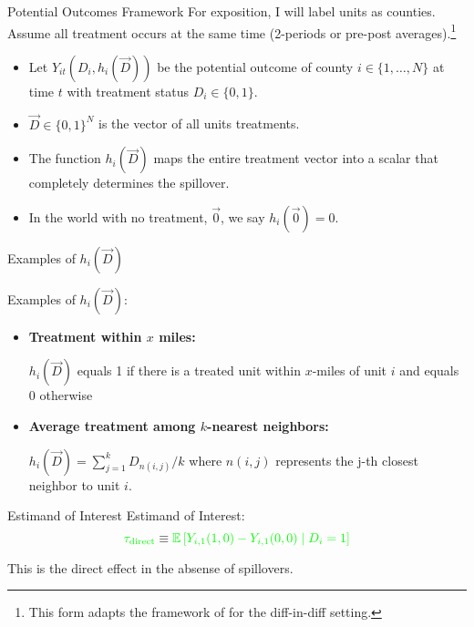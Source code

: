 \documentclass[aspectratio=43]{beamer}
\begin{document}
\begin{frame}{Potential Outcomes Framework}
    For exposition, I will label units as counties. Assume all treatment occurs at the same time (2-periods or pre-post averages).\footnote{This form adapts the framework of \citet{Vazquez-Bare_2019} for the diff-in-diff setting.}
    
    \begin{itemize}
        \item Let $Y_{it}(D_i, h_i(\vec{D}))$ be the potential outcome of county $i \in \{ 1, \dots, N \}$ at time $t$ with treatment status $D_i \in \{0, 1\}$.
        
        \item $\vec{D} \in \{0,1\}^N$ is the vector of all units treatments.
        
        \item The function $h_i(\vec{D})$ maps the entire treatment vector into a scalar that completely determines the spillover. 
        
        \item In the world with no treatment, $\vec{0}$, we say $h_i(\vec{0}) = 0$.
    \end{itemize}
\end{frame}

\begin{frame}{Examples of $h_i(\vec{D})$}
    
    Examples of $h_i(\vec{D})$:
    
    \begin{itemize}
        \item \textbf{Treatment within $x$ miles:}
        
        $h_i(\vec{D})$ equals 1 if there is a treated unit within $x$-miles of unit $i$ and equals 0 otherwise
            
        \vspace{2.5mm}
        \item \textbf{Average treatment among $k$-nearest neighbors:}
        
        $h_i(\vec{D}) = \sum_{j = 1}^k D_{n(i,j)} / k$ where $n(i,j)$ represents the j-th closest neighbor to unit $i$. 


    \end{itemize}
\end{frame}

\begin{frame}{Estimand of Interest}
    Estimand of Interest: \[ 
        \textcolor{green}{\tau_{\text{direct}}} \equiv \textcolor{green}{\mathbb{E}\left[ Y_{i,1}(1, 0) - Y_{i,1}(0, 0) \mid D_i = 1\right]}
    \]

    This is the direct effect in the absense of spillovers.
\end{frame}
\end{document}
